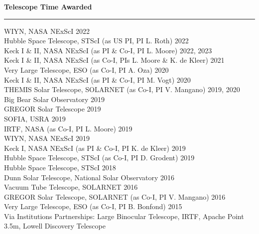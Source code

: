 \documentclass[12pt]{report}
\begin{document}
\noindent\bf{Telescope Time Awarded}\rm \hspace*{\fill} \\
\rule{\textwidth}{1pt}
WIYN, NASA NExScI \hfill 2022\\
Hubble Space Telescope, STScI (as US PI, PI L. Roth) \hfill 2022\\
Keck I \& II, NASA NExScI  (as PI \& Co-I, PI L. Moore) \hfill 2022, 2023\\
Keck I \& II, NASA NExScI (as Co-I, PIs L. Moore \& K. de Kleer) \hfill 2021\\
Very Large Telescope, ESO (as Co-I, PI A. Oza) \hfill 2020\\
Keck I \& II, NASA NExScI  (as PI \& Co-I, PI M. Vogt) \hfill 2020\\
THEMIS Solar Telescope, SOLARNET (as Co-I, PI V. Mangano) \hfill 2019, 2020\\
Big Bear Solar Observatory \hfill 2019\\
GREGOR Solar Telescope \hfill 2019\\
SOFIA, USRA \hfill 2019\\
IRTF, NASA (as Co-I, PI L. Moore) \hfill 2019\\
WIYN, NASA NExScI \hfill 2019\\
Keck I, NASA NExScI (as PI \& Co-I, PI K. de Kleer) \hfill 2019\\
Hubble Space Telescope, STScI (as Co-I, PI D. Grodent) \hfill 2019\\
Hubble Space Telescope, STScI \hfill 2018\\
Dunn Solar Telescope, National Solar Observatory \hfill 2016\\
Vacuum Tube Telescope, SOLARNET \hfill 2016\\
GREGOR Solar Telescope, SOLARNET (as Co-I, PI V. Mangano) \hfill 2016\\
Very Large Telescope, ESO (as Co-I, PI B. Bonfond) \hfill 2015\\
Via Institutions Partnerships: Large Binocular Telescope, IRTF, Apache Point 3.5m, Lowell Discovery Telescope\\
\end{document}
